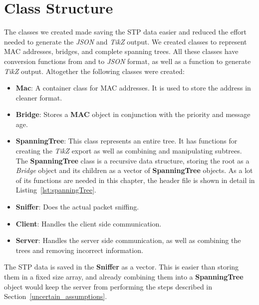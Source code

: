 \section{Class Structure}
\label{data}
The classes we created made saving the STP data easier and reduced the effort needed to generate the \textit{JSON} and \textit{TikZ} output.
We created classes to represent MAC addresses, bridges, and complete spanning trees.
All these classes have conversion functions from and to \textit{JSON} format, as well as a function to generate \textit{TikZ} output.
Altogether the following classes were created:
\begin{itemize}
    \item \textbf{Mac}: A container class for MAC addresses.
        It is used to store the address in cleaner format.
    \item \textbf{Bridge}: Stores a \textbf{MAC} object in conjunction with the priority and message age.
    \item \textbf{SpanningTree}: This class represents an entire tree.
        It has functions for creating the \textit{TikZ} export as well as combining and manipulating subtrees.
        The \textbf{SpanningTree} class is a recursive data structure, storing the root as a \textit{Bridge} object and its children as a vector of \textbf{SpanningTree} objects.
        As a lot of its functions are needed in this chapter, the header file is shown in detail in Listing~\ref{lst:spanningTree}.
    \item \textbf{Sniffer}: Does the actual packet sniffing.
    \item \textbf{Client}: Handles the client side communication.
    \item \textbf{Server}: Handles the server side communication, as well as combining the trees and removing incorrect information.
\end{itemize}

The STP data is saved in the \textbf{Sniffer} as a vector.
This is easier than storing them in a fixed size array, and already combining them into a \textbf{SpanningTree} object would keep the server from performing the steps described in Section~\ref{uncertain_assumptions}.

